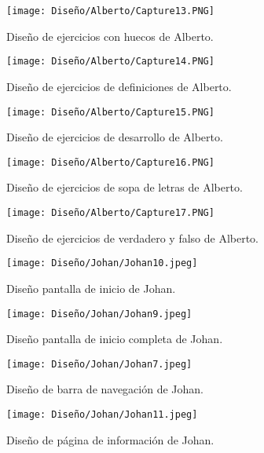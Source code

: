 \begin{figure}[ht!]
  \centering
  \texttt{[image: Diseño/Alberto/Capture13.PNG]}
  \caption{Diseño de ejercicios con huecos de Alberto.}


\end{figure}
\begin{figure}[ht!]
  \centering
  \texttt{[image: Diseño/Alberto/Capture14.PNG]}
  \caption{Diseño de ejercicios de definiciones de Alberto.}


\end{figure}
\begin{figure}[ht!]
  \centering
  \texttt{[image: Diseño/Alberto/Capture15.PNG]}
  \caption{Diseño de ejercicios de desarrollo de Alberto.}


\end{figure}
\begin{figure}[ht!]
  \centering
  \texttt{[image: Diseño/Alberto/Capture16.PNG]}
  \caption{Diseño de ejercicios de sopa de letras de Alberto.}


\end{figure}
\begin{figure}[ht!]
  \centering
  \texttt{[image: Diseño/Alberto/Capture17.PNG]}
  \caption{Diseño de ejercicios de verdadero y falso de Alberto.}
\end{figure}

\begin{figure}[ht!]
  \centering
  \texttt{[image: Diseño/Johan/Johan10.jpeg]}
  \caption{Diseño pantalla de inicio de Johan.}
  \label{Johan10}
\end{figure}

\begin{figure}[ht!]
  \centering
  \texttt{[image: Diseño/Johan/Johan9.jpeg]}
  \caption{Diseño pantalla de inicio completa de Johan.}
  \label{Johan9}
\end{figure}

\begin{figure}[ht!]
  \centering
  \texttt{[image: Diseño/Johan/Johan7.jpeg]}
  \caption{Diseño de barra de navegación de Johan.}
  \label{Johan7}
\end{figure}

\begin{figure}[ht!]
  \centering
  \texttt{[image: Diseño/Johan/Johan11.jpeg]}
  \caption{Diseño de página de información de Johan.}
  \label{Johan11}
\end{figure}

